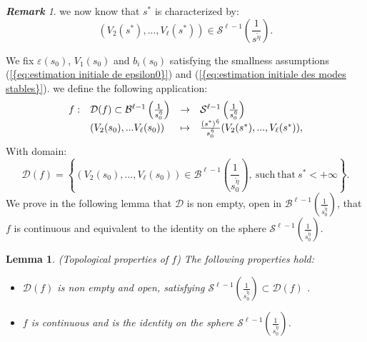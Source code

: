 \documentclass[11pt,a4paper,reqno]{amsart}
\newtheorem{lemma}[theorem]{Lemma}
\theoremstyle{remark}
\newtheorem{remark}[theorem]{\it \bf{Remark}\/}
\numberwithin{equation}{section}
\begin{document}
\begin{remark}
we now know that $s^*$ is characterized by:
$$
(V_2(s^*),...,V_{\ell}(s^*))\in \mathcal{S}^{\ell-1}\left(\frac{1}{s^{\tilde{\eta}}} \right) .
$$
\end{remark} \label{end:rem:condition sortie}
We fix $\varepsilon(s_0)$, $V_1(s_0)$ and $b_i(s_0)$ satisfying the smallness assumptions {{\rm (\ref{{eq:estimation initiale de epsilon0}})}} and {{\rm (\ref{{eq:estimation initiale des modes stables}})}}. we define the following application:
\begin{equation}
\begin{array}{l l l l}
f: &\mathcal{D}(f)\subset \mathcal{B}^{\ell-1}\left(\frac{1}{s_0^{\tilde{\eta}}} \right) &\rightarrow & \mathcal{S}^{\ell-1}\left(\frac{1}{s_0^{\tilde{\eta}}} \right) \\
& (V_2(s_0),...V_{\ell}(s_0)) & \mapsto & \frac{(s^*)^{\tilde{\eta}}}{s_0^{\tilde{\eta}}} (V_2(s^*),...,V_{\ell}(s^*)) ,
\end{array}
\end{equation}
With domain:
\begin{equation}
\mathcal{D}(f)=\left\{(V_2(s_0),...,V_{\ell}(s_0))\in \mathcal{B}^{\ell-1}\left(\frac{1}{s_0^{\tilde{\eta}}} \right), \ \text{such} \ \text{that} \ s^* <+\infty  \right\} .
\end{equation}
We prove in the following lemma that $\mathcal{D}$ is non empty, open in $\mathcal{B}^{\ell-1}\left(\frac{1}{s_0^{\tilde{\eta}}} \right)$, that $f$ is continuous and equivalent to the identity on the sphere $ \mathcal{S}^{\ell-1}\left(\frac{1}{s_0^{\tilde{\eta}}} \right) $.

\begin{lemma}\label{endoftheproof:lem:proprietes de f}
\emph{(Topological properties of $f$)} The following properties hold:
\begin{itemize}
\item[(i)] $\mathcal{D}(f)$ is non empty and open, satisfying $\mathcal{S}^{\ell-1}\left(\frac{1}{s_0^{\tilde{\eta}}} \right)\subset \mathcal{D}(f)$ .
\item[(ii)] $f$ is continuous and is the identity on the sphere $\mathcal{S}^{\ell-1}\left(\frac{1}{s_0^{\tilde{\eta}}} \right)$.
\end{itemize}
\end{lemma}
\end{document}
